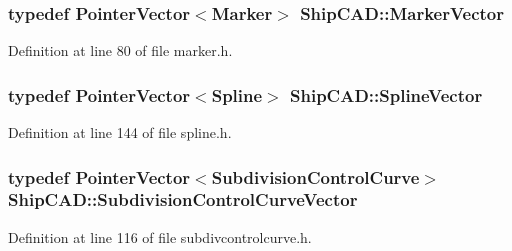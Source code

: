 \hypertarget{namespaceShipCAD_a36fff5b53986f6d6976afc749463ef22}{
\subsubsection[{Marker\-Vector}]{\setlength{\rightskip}{0pt plus 5cm}typedef {\bf Pointer\-Vector}$<${\bf Marker}$>$ {\bf Ship\-C\-A\-D\-::\-Marker\-Vector}}}\label{namespaceShipCAD_a36fff5b53986f6d6976afc749463ef22}


Definition at line 80 of file marker.\-h.

\hypertarget{namespaceShipCAD_a053b941b2c87049bb9380428d4d5a056}{
\subsubsection[{Spline\-Vector}]{\setlength{\rightskip}{0pt plus 5cm}typedef {\bf Pointer\-Vector}$<${\bf Spline}$>$ {\bf Ship\-C\-A\-D\-::\-Spline\-Vector}}}\label{namespaceShipCAD_a053b941b2c87049bb9380428d4d5a056}


Definition at line 144 of file spline.\-h.

\hypertarget{namespaceShipCAD_aa9dd7a826ae5254e377dac43ea19da80}{
\subsubsection[{Subdivision\-Control\-Curve\-Vector}]{\setlength{\rightskip}{0pt plus 5cm}typedef {\bf Pointer\-Vector}$<${\bf Subdivision\-Control\-Curve}$>$ {\bf Ship\-C\-A\-D\-::\-Subdivision\-Control\-Curve\-Vector}}}\label{namespaceShipCAD_aa9dd7a826ae5254e377dac43ea19da80}


Definition at line 116 of file subdivcontrolcurve.\-h.



